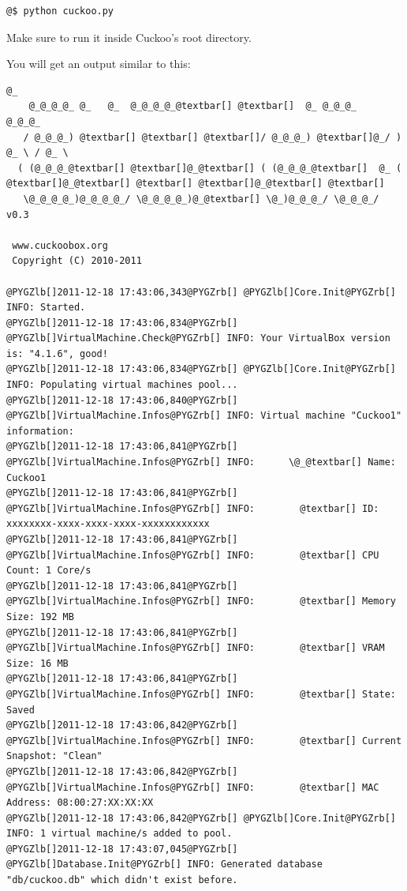 \documentclass[letterpaper,10pt,english]{sphinxmanual}
\begin{document}
\begin{Verbatim}[commandchars=@\[\]]
@$ python cuckoo.py
\end{Verbatim}

Make sure to run it inside Cuckoo's root directory.

You will get an output similar to this:

\begin{Verbatim}[commandchars=@\[\]]
                     @_
    @_@_@_@_ @_   @_  @_@_@_@_@textbar[] @textbar[]  @_ @_@_@_   @_@_@_
   / @_@_@_) @textbar[] @textbar[] @textbar[]/ @_@_@_) @textbar[]@_/ ) @_ \ / @_ \
  ( (@_@_@_@textbar[] @textbar[]@_@textbar[] ( (@_@_@_@textbar[]  @_ ( @textbar[]@_@textbar[] @textbar[] @textbar[]@_@textbar[] @textbar[]
   \@_@_@_@_)@_@_@_@_/ \@_@_@_@_)@_@textbar[] \@_)@_@_@_/ \@_@_@_/ v0.3

 www.cuckoobox.org
 Copyright (C) 2010-2011

@PYGZlb[]2011-12-18 17:43:06,343@PYGZrb[] @PYGZlb[]Core.Init@PYGZrb[] INFO: Started.
@PYGZlb[]2011-12-18 17:43:06,834@PYGZrb[] @PYGZlb[]VirtualMachine.Check@PYGZrb[] INFO: Your VirtualBox version is: "4.1.6", good!
@PYGZlb[]2011-12-18 17:43:06,834@PYGZrb[] @PYGZlb[]Core.Init@PYGZrb[] INFO: Populating virtual machines pool...
@PYGZlb[]2011-12-18 17:43:06,840@PYGZrb[] @PYGZlb[]VirtualMachine.Infos@PYGZrb[] INFO: Virtual machine "Cuckoo1" information:
@PYGZlb[]2011-12-18 17:43:06,841@PYGZrb[] @PYGZlb[]VirtualMachine.Infos@PYGZrb[] INFO:      \@_@textbar[] Name: Cuckoo1
@PYGZlb[]2011-12-18 17:43:06,841@PYGZrb[] @PYGZlb[]VirtualMachine.Infos@PYGZrb[] INFO:        @textbar[] ID: xxxxxxxx-xxxx-xxxx-xxxx-xxxxxxxxxxxx
@PYGZlb[]2011-12-18 17:43:06,841@PYGZrb[] @PYGZlb[]VirtualMachine.Infos@PYGZrb[] INFO:        @textbar[] CPU Count: 1 Core/s
@PYGZlb[]2011-12-18 17:43:06,841@PYGZrb[] @PYGZlb[]VirtualMachine.Infos@PYGZrb[] INFO:        @textbar[] Memory Size: 192 MB
@PYGZlb[]2011-12-18 17:43:06,841@PYGZrb[] @PYGZlb[]VirtualMachine.Infos@PYGZrb[] INFO:        @textbar[] VRAM Size: 16 MB
@PYGZlb[]2011-12-18 17:43:06,841@PYGZrb[] @PYGZlb[]VirtualMachine.Infos@PYGZrb[] INFO:        @textbar[] State: Saved
@PYGZlb[]2011-12-18 17:43:06,842@PYGZrb[] @PYGZlb[]VirtualMachine.Infos@PYGZrb[] INFO:        @textbar[] Current Snapshot: "Clean"
@PYGZlb[]2011-12-18 17:43:06,842@PYGZrb[] @PYGZlb[]VirtualMachine.Infos@PYGZrb[] INFO:        @textbar[] MAC Address: 08:00:27:XX:XX:XX
@PYGZlb[]2011-12-18 17:43:06,842@PYGZrb[] @PYGZlb[]Core.Init@PYGZrb[] INFO: 1 virtual machine/s added to pool.
@PYGZlb[]2011-12-18 17:43:07,045@PYGZrb[] @PYGZlb[]Database.Init@PYGZrb[] INFO: Generated database "db/cuckoo.db" which didn't exist before.
\end{Verbatim}
\end{document}
